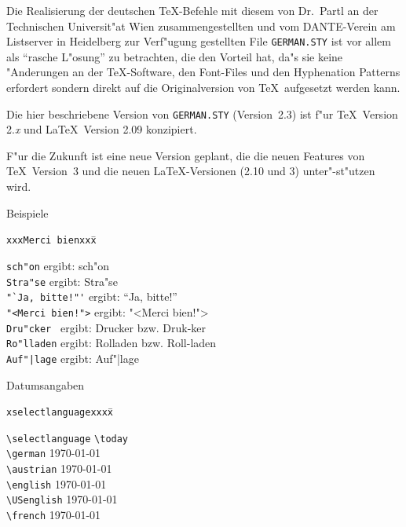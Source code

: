 Die Realisierung der deutschen \TeX-Befehle mit diesem
von Dr.~Partl an der Technischen Universit"at Wien zusammengestellten
und vom DANTE-Verein am Listserver in Heidelberg zur Verf"ugung
gestellten
File \hbox{\tt GERMAN.STY} ist vor allem als "`rasche           %
L"osung"' zu betrachten, die den Vorteil hat, da"s sie keine
"Anderungen an der \TeX-Software, den Font-Files und den Hyphenation
Patterns erfordert sondern direkt auf die Originalversion von \TeX\
aufgesetzt werden kann.

Die hier beschriebene Version von \hbox{\tt GERMAN.STY}         %
(Version~2.3) ist f"ur \TeX\ Version 2.{\it x\/}
und \LaTeX\ Version 2.09 konzipiert.

F"ur die Zukunft ist eine neue Version geplant, die die neuen
Features von \TeX\ Version~3 und die neuen \LaTeX-Versionen
(2.10 und 3) unter"-st"utzen wird.

\begin{table}[hp]
\caption{Beispiele}

\begin{center}
\begin{tabbing}
{\tt xxxMerci bienxxx}\qquad \= \kill

\verb|sch"on| \> ergibt:\qquad
        sch"on \\[3pt]
\verb|Stra"se| \> ergibt:\qquad
        Stra"se \\[3pt]
\verb|"`Ja, bitte!"'| \> ergibt:\qquad
        "`Ja, bitte!"' \\[3pt]
\verb|"<Merci bien!">| \> ergibt:\qquad
        "<Merci bien!"> \\[3pt]
\verb|Dru"cker | \> ergibt:\qquad
        Drucker bzw. Druk-ker \\[3pt]
\verb|Ro"lladen| \> ergibt:\qquad
        Rolladen bzw. Roll-laden \\[3pt]
\verb.Auf"|lage. \> ergibt:\qquad
        Auf"|lage
\end{tabbing}
\end{center}
\end{table}

\begin{table}[hp]
  
\caption{Datumsangaben}

\begin{center}
\begin{tabbing}
{\tt xselectlanguagexxxx}\qquad \= \kill

\verb|\selectlanguage| \> \verb|\today | \\[9pt]
\verb|\german| \>         \selectlanguage\german    \today  \\[3pt]
\verb|\austrian| \>       \selectlanguage\austrian  \today  \\[3pt]
\verb|\english| \>        \selectlanguage\english   \today  \\[3pt]
\verb|\USenglish| \>      \selectlanguage\USenglish \today  \\[3pt]
\verb|\french| \>         \selectlanguage\french    \today

\end{tabbing}
\end{center}
\end{table}


